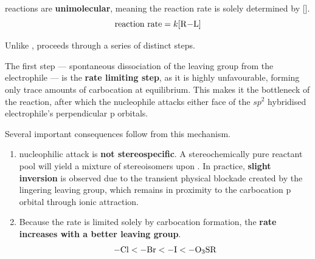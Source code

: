 \documentclass[10pt]{article}
\begin{document}
  \begin{core}{\sno}

    \sno reactions are \textbf{unimolecular}, meaning the reaction rate is solely determined by [].
    \[
      \text{reaction rate} = k[\ce{R-L}]
    \]

    Unlike \snt, \sno proceeds through a series of distinct steps.
    

    The first step --- spontaneous dissociation of the leaving group from the electrophile --- is the \textbf{rate limiting step}, as it is highly unfavourable, forming only trace amounts of carbocation at equilibrium. This makes it the bottleneck of the reaction, after which the nucleophile attacks either face of the $sp^2$ hybridised electrophile's perpendicular p orbitals.

    Several important consequences follow from this mechanism.

    \begin{enumerate}

      \item \sno nucleophilic attack is \textbf{not stereospecific}. A stereochemically pure reactant pool will yield a mixture of stereoisomers upon \sno. In practice, \textbf{slight inversion} is observed due to the transient physical blockade created by the lingering leaving group, which remains in proximity to the carbocation p orbital through ionic attraction.

      \item Because the rate is limited solely by carbocation formation, the \textbf{rate increases with a better leaving group}.
      \[
        \ce{-Cl} < \ce{-Br} < \ce{-I} < \ce{-O3SR}
      \]


\end{enumerate}
\end{core}
\end{document}
